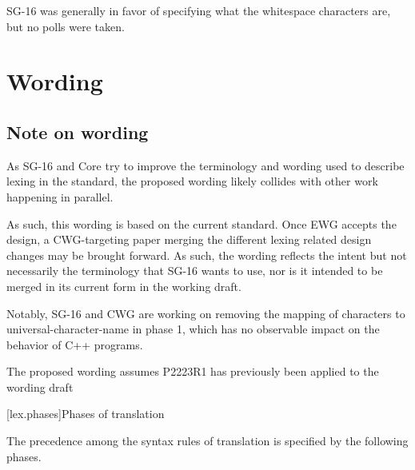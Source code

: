 \documentclass{wg21}
\begin{document}
SG-16 was generally in favor of specifying what the whitespace characters are, but no polls were taken.

\section{Wording}

\subsection{Note on wording}

As SG-16 and Core try to improve the terminology and wording used to describe lexing in the standard,
the proposed wording likely collides with other work happening in parallel.

As such, this wording is based on the current standard.
Once EWG accepts the design, a CWG-targeting paper merging the different lexing related design changes may be brought forward.
As such, the wording reflects the intent but not necessarily the terminology that SG-16 wants to use, nor is it intended to be merged in its current form in the working draft.

Notably, SG-16 and CWG are working on removing the mapping of characters to universal-character-name in phase 1, which has no observable impact on the behavior of C++ programs.

The proposed wording assumes P2223R1 has previously been applied to the wording draft


[lex.phases]{Phases of translation}%

\pnum
{}%
The precedence among the syntax rules of translation is specified by the
following phases.
\end{document}
